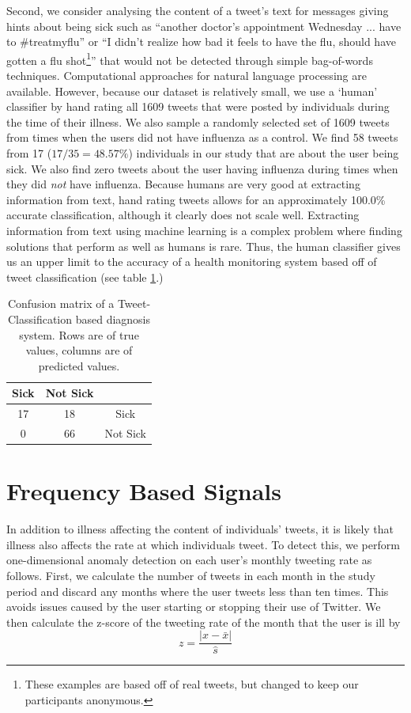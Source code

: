 \documentclass{sig-alternate-2013}
\begin{document}
Second, we consider analysing the content of a tweet's text for messages giving hints about being sick such as ``another doctor's appointment Wednesday ... have to \#treatmyflu'' or ``I didn't realize how bad it feels to have the flu, should have gotten a flu shot\footnote{These examples are based off of real tweets, but changed to keep our participants anonymous.}'' that would not be detected through simple bag-of-words techniques. Computational approaches for natural language processing are available. However, because our dataset is relatively small, we use a `human' classifier by hand rating all 1609 tweets that were posted by individuals during the time of their illness. We also sample a randomly selected set of 1609 tweets from times when the users did not have influenza as a control. We find 58 tweets from 17 (\(17/35 = 48.57\%\))  individuals in our study that are about the user being sick. We also find zero tweets about the user having influenza during times when they did \emph{not} have influenza. Because humans are very good at extracting information from text, hand rating tweets allows for an approximately 100.0\% accurate classification, although it clearly does not scale well. Extracting information from text using machine learning is a complex problem where finding solutions that perform as well as humans is rare. Thus, the human classifier gives us an upper limit to the accuracy of a health monitoring system based off of tweet classification (see table \ref{tab:tweet_classified_confusion}.)

\begin{table}
\centering
\begin{tabular}{|c|c|c|} \hline
Sick&Not Sick&\ \\ \hline
17 & 18 & Sick\\ \hline
0 & 66  & Not Sick\\
\hline\end{tabular}
\caption{Confusion matrix of a Tweet-Classification based diagnosis system. Rows are of true values, columns are of predicted values.}
\label{tab:tweet_classified_confusion}
\end{table}

\section{Frequency Based Signals}

In addition to illness affecting the content of individuals' tweets, it is likely that illness also affects the rate at which individuals tweet. To detect this, we perform one-dimensional anomaly detection on each user's monthly tweeting rate as follows. First, we calculate the number of tweets in each month in the study period and discard any months where the user tweets less than ten times. This avoids issues caused by the user starting or stopping their use of Twitter. We then calculate the z-score of the tweeting rate of the month that the user is ill by
\begin{equation}
z = \frac{|x - \bar{x}|}{\hat{s}}
\end{equation}
\end{document}
